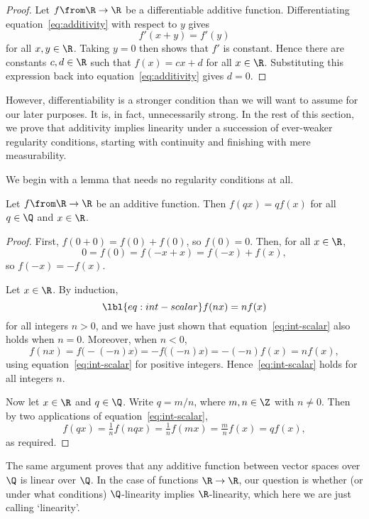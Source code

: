 \begin{proof}
Let $f \from \R \to \R$ be a differentiable additive function.
Differentiating equation~\eqref{eq:additivity} with respect to $y$ gives
\[
f'(x + y) = f'(y)
\]
for all $x, y \in \R$.  Taking $y = 0$ then shows that $f'$ is constant.
Hence there are constants $c, d \in \R$ such that $f(x) = cx + d$ for all
$x \in \R$.  Substituting this expression back into
equation~\eqref{eq:additivity} gives $d = 0$.
\end{proof}

However, differentiability is a stronger condition than we will want to
assume for our later purposes.  It is, in fact, unnecessarily strong.  In
the rest of this section, we prove that additivity implies linearity under
a succession of ever-weaker regularity conditions, starting with continuity
and finishing with mere measurability.

We begin with a lemma that needs no regularity conditions at all.

\begin{lemma}
Let $f \from \R \to \R$ be an additive function.  Then $f(qx) = qf(x)$ for
all $q \in \Q$ and $x \in \R$.  
\end{lemma}

\begin{proof}
First, $f(0 + 0) = f(0) + f(0)$, so $f(0) = 0$.  Then, for all $x \in \R$,
\[
0 = f(0) = f(-x + x) = f(-x) + f(x),
\]
so $f(-x) = -f(x)$.

Let $x \in \R$.  By induction,
% 
\begin{equation}
\lbl{eq:int-scalar}
f(nx) = nf(x)
\end{equation}
% 
for all integers $n > 0$, and we have just shown that
equation~\eqref{eq:int-scalar} also holds when $n = 0$.  Moreover, when $n
< 0$,
\[
f(nx) 
=
f\bigl(-(-n)x\bigr)
=
-f\bigl((-n)x\bigr)
=
-(-n)f(x)
=
nf(x),
\]
using equation~\eqref{eq:int-scalar} for positive integers.
Hence~\eqref{eq:int-scalar} holds for all integers $n$.

Now let $x \in \R$ and $q \in \Q$.  Write $q = m/n$, where $m, n \in \Z$
with $n \neq 0$.  Then by two applications of
equation~\eqref{eq:int-scalar}, 
\[
f(qx)
=
\tfrac{1}{n} f(nqx)
=
\tfrac{1}{n} f(mx)
=
\tfrac{m}{n} f(x)
=
qf(x),
\]
as required.
\end{proof}

\begin{remark}
The same argument proves that any additive function between vector spaces
over $\Q$ is linear over $\Q$.  In the case of functions $\R \to \R$, our
question is whether (or under what conditions) $\Q$-linearity implies
$\R$-linearity, which here we are just calling `linearity'.
\end{remark}

